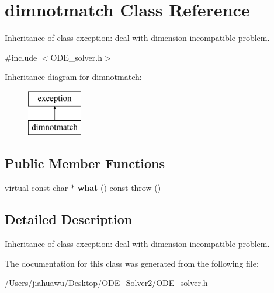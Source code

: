 \hypertarget{classdimnotmatch}{}\section{dimnotmatch Class Reference}
\label{classdimnotmatch}


Inheritance of class exception\+: deal with dimension incompatible problem.  




{\ttfamily \#include $<$O\+D\+E\+\_\+solver.\+h$>$}

Inheritance diagram for dimnotmatch\+:\begin{figure}[H]
\begin{center}
\leavevmode
\includegraphics[height=2.000000cm]{classdimnotmatch}
\end{center}
\end{figure}
\subsection*{Public Member Functions}
\begin{DoxyCompactItemize}
\item 
\mbox{\label{classdimnotmatch_af8ab958cff29859339d5493960a0c444}} 
virtual const char $\ast$ {\bfseries what} () const  throw ()
\end{DoxyCompactItemize}


\subsection{Detailed Description}
Inheritance of class exception\+: deal with dimension incompatible problem. 

The documentation for this class was generated from the following file\+:\begin{DoxyCompactItemize}
\item 
/\+Users/jiahuawu/\+Desktop/\+O\+D\+E\+\_\+\+Solver2/O\+D\+E\+\_\+solver.\+h\end{DoxyCompactItemize}
